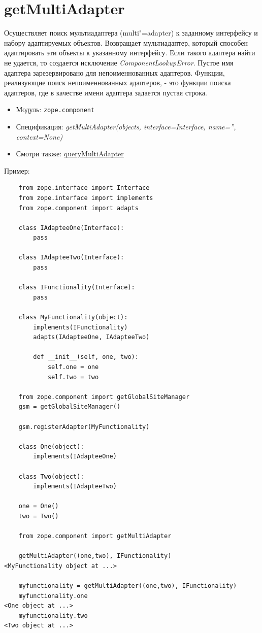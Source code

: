 \documentclass[a4paper,openany,twoside,draft]{book}
\providecommand*{\DUroletitlereference}[1]{\textsl{#1}}
\begin{document}
\section*{getMultiAdapter%
  \label{getmultiadapter}%
}

Осуществляет поиск мультиадаптера (multi"=adapter) к заданному интерфейсу и набору адаптируемых объектов.  Возвращает мультиадаптер, который способен адаптировать эти объекты к указанному интерфейсу.  Если такого адаптера найти не удается, то создается исключение \DUroletitlereference{ComponentLookupError}.  Пустое имя адаптера зарезервировано для непоименнованных адаптеров.  Функции, реализующие поиск непоименнованных адаптеров, - это функции поиска адаптеров, где в качестве имени адаптера задается пустая строка.

\begin{itemize}

\item Модуль: \texttt{zope.component}

\item Спецификация: \DUroletitlereference{getMultiAdapter(objects, interface=Interface, name='', context=None)}

\item Смотри также: \hyperref[querymultiadapter]{queryMultiAdapter}

\end{itemize}

Пример:

\begin{verbatim}
    from zope.interface import Interface
    from zope.interface import implements
    from zope.component import adapts

    class IAdapteeOne(Interface):
        pass

    class IAdapteeTwo(Interface):
        pass

    class IFunctionality(Interface):
        pass

    class MyFunctionality(object):
        implements(IFunctionality)
        adapts(IAdapteeOne, IAdapteeTwo)

        def __init__(self, one, two):
            self.one = one
            self.two = two

    from zope.component import getGlobalSiteManager
    gsm = getGlobalSiteManager()

    gsm.registerAdapter(MyFunctionality)

    class One(object):
        implements(IAdapteeOne)

    class Two(object):
        implements(IAdapteeTwo)

    one = One()
    two = Two()

    from zope.component import getMultiAdapter

    getMultiAdapter((one,two), IFunctionality)
<MyFunctionality object at ...>

    myfunctionality = getMultiAdapter((one,two), IFunctionality)
    myfunctionality.one
<One object at ...>
    myfunctionality.two
<Two object at ...>
\end{verbatim}
\end{document}
